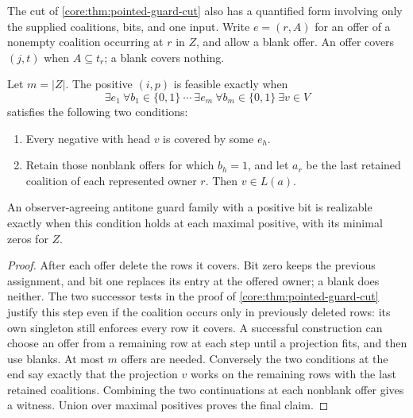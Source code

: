 The cut of \cref{core:thm:pointed-guard-cut} also has a quantified form involving only the
supplied coalitions, bits, and one input. Write $e=(r,A)$ for an offer
of a nonempty coalition occurring at $r$ in $Z$, and allow a blank
offer. An offer covers $(j,t)$ when $A\subseteq t_r$; a blank covers
nothing.

\begin{corollary}
\label{core:cor:alternating-transversal}
Let $m=|Z|$. The positive $(i,p)$ is feasible exactly when
\[
  \exists e_1\ \forall b_1\in\{0,1\}\ \cdots\
  \exists e_m\ \forall b_m\in\{0,1\}\ \exists v\in V
\]
satisfies the following two conditions:
\begin{enumerate}
\item Every negative with head $v$ is covered by some $e_h$.
\item Retain those nonblank offers for which $b_h=1$, and let $a_r$
be the last retained coalition of each represented owner $r$. Then
$v\in L(a)$.
\end{enumerate}
An observer-agreeing antitone guard family with a positive bit is
realizable exactly when this condition holds at each maximal positive,
with its minimal zeros for $Z$.
\end{corollary}
\begin{proof}
After each offer delete the rows it covers. Bit zero keeps the previous
assignment, and bit one replaces its entry at the offered owner; a
blank does neither. The two successor tests in the proof of
\cref{core:thm:pointed-guard-cut} justify this step even if the
coalition occurs only in previously deleted rows: its own singleton
still enforces every row it covers. A successful construction can
choose an offer from a remaining row at each step until a projection
fits, and then use blanks. At most $m$ offers are needed.
Conversely the two conditions at the end say exactly that the
projection $v$ works on the remaining rows with the last retained
coalitions. Combining the two continuations at each nonblank offer
gives a witness. Union over maximal positives proves the final claim.
\end{proof}

